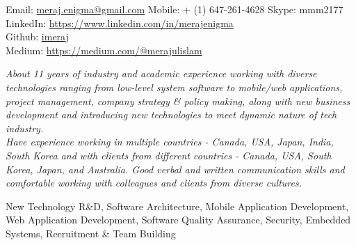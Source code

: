 \documentclass[10pt,a4paper]{article} %
\begin{document}


\noindent Email: \href{mailto:meraj.enigma@gmail.com}{meraj.enigma@gmail.com}\bull
\textsmaller Mobile: {+} (1) 647-261-4628 \bull Skype: mmm2177\\
LinkedIn: \href{https://www.linkedin.com/in/merajenigma}{https://www.linkedin.com/in/merajenigma}\\
Github: \href{https://github.com/imeraj}{imeraj} \\
Medium: \href{https://medium.com/@merajulislam} {https://medium.com/@merajulislam}


\spacedhrule{0.9em}{-0.4em} %



\vspace{-1.3em} %

\begin{multicols}{2}  %
\noindent \textit{About 11 years of industry and academic experience working with diverse technologies ranging from low-level system software to mobile/web applications, project management, company strategy \& policy making, along with new business development and introducing new technologies to meet dynamic nature of tech industry.\\
Have experience working in multiple countries - Canada, USA, Japan, India, South Korea and with clients from different countries - Canada, USA, South Korea, Japan, and Australia. Good verbal and written communication skills and comfortable working with colleagues and clients from diverse cultures.}
\end{multicols}

 New Technology R\&D, Software Architecture, Mobile Application Development, Web Application Development, Software Quality Assurance, Security, Embedded Systems, Recruitment \& Team Building\\
\end{document}
